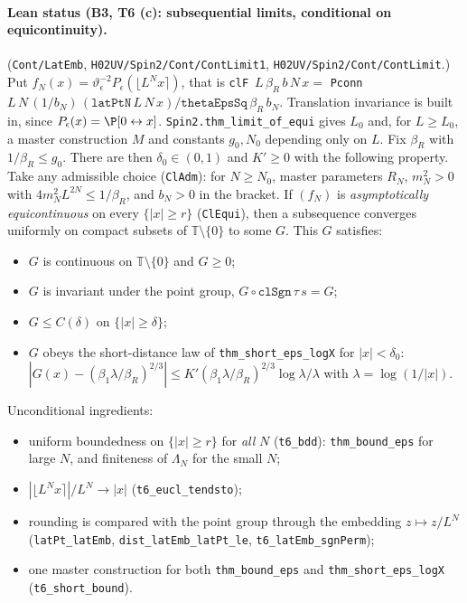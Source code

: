 \documentclass[11pt]{amsart}
\theoremstyle{definition}
\theoremstyle{remark}
\numberwithin{equation}{section}
\newcommand{\T}{\mathbb{T}}
\begin{document}
\paragraph{Lean status (B3, T6 (c): subsequential limits, conditional on equicontinuity).}
(\texttt{Cont/LatEmb}, \texttt{H02UV/Spin2/Cont/ContLimit1}, \texttt{H02UV/Spin2/Cont/ContLimit}.) Put
$f_N(x)=\vartheta_\epsilon^{-2}P_\epsilon(\lfloor L^Nx\rceil)$, that is
\texttt{clF}~$L\,\beta_R\,b\,N\,x=$ \texttt{Pconn}~$L\,N\,(1/b_N)\,(\texttt{latPtN}\,L\,N\,x)/\texttt{thetaEpsSq}\,\beta_R\,b_N$.
Translation invariance is built in, since $P_\epsilon(x)=\P[0\leftrightarrow x]$.
\texttt{Spin2.thm\_limit\_of\_equi} gives $L_0$ and, for $L\ge L_0$, a master construction $M$ and constants $g_0,N_0$
depending only on $L$. Fix $\beta_R$ with $1/\beta_R\le g_0$. There are then $\delta_0\in(0,1)$ and $K'\ge0$ with the
following property. Take any admissible choice (\texttt{ClAdm}): for $N\ge N_0$, master parameters $R_N$, $m_N^2>0$ with
$4m_N^2L^{2N}\le1/\beta_R$, and $b_N>0$ in the bracket. If $(f_N)$ is \emph{asymptotically equicontinuous} on every
$\{|x|\ge r\}$ (\texttt{ClEqui}), then a subsequence converges uniformly on compact subsets of $\T\setminus\{0\}$ to
some $G$. This $G$ satisfies:
\begin{itemize}
\item $G$ is continuous on $\T\setminus\{0\}$ and $G\ge0$;
\item $G$ is invariant under the point group, $G\circ\texttt{clSgn}\,\tau\,s=G$;
\item $G\le C(\delta)$ on $\{|x|\ge\delta\}$;
\item $G$ obeys the short-distance law of \texttt{thm\_short\_eps\_logX} for $|x|<\delta_0$:
$|G(x)-(\beta_1\lambda/\beta_R)^{2/3}|\le K'(\beta_1\lambda/\beta_R)^{2/3}\log\lambda/\lambda$ with $\lambda=\log(1/|x|)$.
\end{itemize}
Unconditional ingredients:
\begin{itemize}
\item uniform boundedness on $\{|x|\ge r\}$ for \emph{all} $N$ (\texttt{t6\_bdd}): \texttt{thm\_bound\_eps} for large $N$,
and finiteness of $\Lambda_N$ for the small $N$;
\item $|\lfloor L^Nx\rceil|/L^N\to|x|$ (\texttt{t6\_eucl\_tendsto});
\item rounding is compared with the point group through the embedding $z\mapsto z/L^N$ (\texttt{latPt\_latEmb},
\texttt{dist\_latEmb\_latPt\_le}, \texttt{t6\_latEmb\_sgnPerm});
\item one master construction for both \texttt{thm\_bound\_eps} and \texttt{thm\_short\_eps\_logX} (\texttt{t6\_short\_bound}).
\end{itemize}
\end{document}
